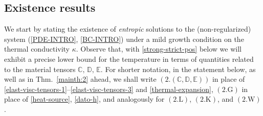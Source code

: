 \documentclass[a4paper,10pt,reqno]{amsart}
\numberwithin{equation}{section}
\numberwithin{equation}{section}
\newcommand{\bbC}{\mathbb{C}}
\newcommand{\bbD}{\mathbb{D}}
\newcommand{\bbE}{\mathbb{E}}
\newcommand{\condu}{\kappa}
\begin{document}
\subsection{Existence results}
\label{ss:2.4}
We start by stating the existence of \emph{entropic} solutions to the (non-regularized) system (\ref{PDE-INTRO}, \ref{BC-INTRO})
under a mild growth condition on the thermal conductivity $\condu$. Observe that, with \eqref{strong-strict-pos} below  we will exhibit 
a precise lower bound for the  temperature in terms of quantities related to the material tensors 
$\bbC,\, \bbD,\, \bbE$. 
For shorter notation,  in the statement below, as well as in Thm.\ \ref{mainth:2} ahead,  we shall write
$(2.(\bbC,\bbD,\bbE))$ in place of \eqref{elast-visc-tensors-1}--\eqref{elast-visc-tensors-3} and \eqref{thermal-expansion}, 
   $(2.\mathrm{G})$ in place of \eqref{heat-source}, \eqref{dato-h}, and analogously for $(2.\mathrm{L})$, $(2.\mathrm{K})$, and
   $(2.\mathrm{W})$.
\end{document}
